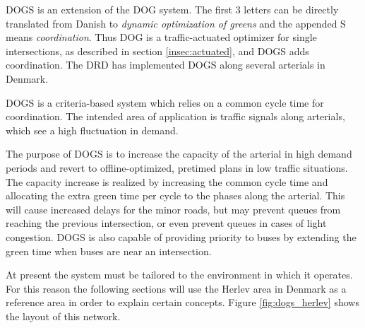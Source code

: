 \label{sec:dogs}

DOGS is an extension of the DOG system. The first 3 letters can be
directly translated from Danish to \textit{dynamic optimization of
greens} and the appended S means
\textit{coordination}. Thus DOG is a traffic-actuated optimizer for
single intersections, as described in section \ref{insec:actuated},
and DOGS adds coordination. The DRD has implemented DOGS along several
arterials in Denmark.

DOGS is a criteria-based system which relies on a common cycle time
for coordination. The intended area of application is traffic signals
along arterials, which see a high fluctuation in demand.

The purpose of DOGS is to increase the capacity of the arterial in
high demand periods and revert to offline-optimized, pretimed plans in
low traffic situations. The capacity increase is realized by
increasing the common cycle time and allocating the extra green time per
cycle to the phases along the arterial. This will cause increased
delays for the minor roads, but may prevent queues from reaching the
previous intersection, or even prevent queues in cases of light
congestion.  DOGS is also capable of providing priority to buses by
extending the green time when buses are near an intersection.

At present the system must be tailored to the environment in which it
operates. For this reason the following sections will use the Herlev
area in Denmark as a reference area in order to explain certain
concepts. Figure \ref{fig:dogs_herlev} shows the layout of this
network.

